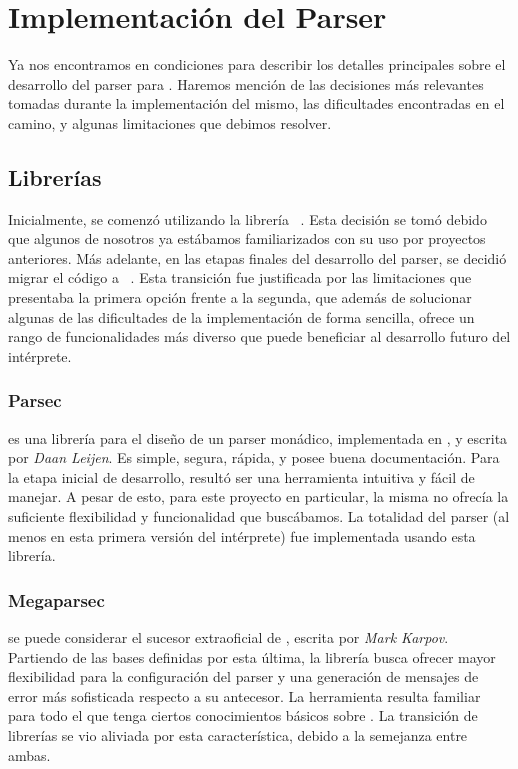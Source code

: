 \section{Implementación del Parser}

Ya nos encontramos en condiciones para describir los detalles principales sobre el desarrollo del parser para \Lenguaje{}.
Haremos mención de las decisiones más relevantes tomadas durante la implementación del mismo, las dificultades encontradas en el camino, y algunas limitaciones que debimos resolver.

\subsection{Librerías}

Inicialmente, se comenzó utilizando la librería \Parsec{}~\cite{Parsec}.
Esta decisión se tomó debido que algunos de nosotros ya estábamos familiarizados con su uso por proyectos anteriores.
Más adelante, en las etapas finales del desarrollo del parser, se decidió migrar el código a \Megaparsec{}~\cite{Megaparsec}.
Esta transición fue justificada por las limitaciones que presentaba la primera opción frente a la segunda, que además de solucionar algunas de las dificultades de la implementación de forma sencilla, ofrece un rango de funcionalidades más diverso que puede beneficiar al desarrollo futuro del intérprete.

\subsubsection{Parsec}

\Parsec{} es una librería para el diseño de un parser monádico, implementada en \Haskell{}, y escrita por \textit{Daan Leijen}.
Es simple, segura, rápida, y posee buena documentación.
Para la etapa inicial de desarrollo, resultó ser una herramienta intuitiva y fácil de manejar.
A pesar de esto, para este proyecto en particular, la misma no ofrecía la suficiente flexibilidad y funcionalidad que buscábamos.
La totalidad del parser (al menos en esta primera versión del intérprete) fue implementada usando esta librería.

\subsubsection{Megaparsec}

\Megaparsec{} se puede considerar el sucesor extraoficial de \Parsec{}, escrita por \textit{Mark Karpov}.
Partiendo de las bases definidas por esta última, la librería busca ofrecer mayor flexibilidad para la configuración del parser y una generación de mensajes de error más sofisticada respecto a su antecesor.
La herramienta resulta familiar para todo el que tenga ciertos conocimientos básicos sobre \Parsec{}.
La transición de librerías se vio aliviada por esta característica, debido a la semejanza entre ambas.

